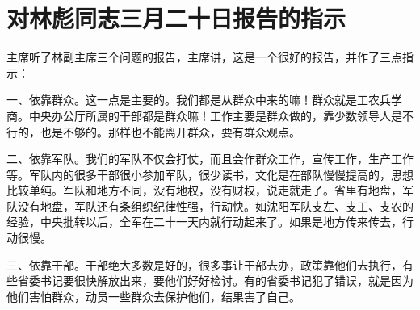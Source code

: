 \section[对林彪同志三月二十日报告的指示（一九六七年三月二十日）]{对林彪同志三月二十日报告的指示}


主席听了林副主席三个问题的报告，主席讲，这是一个很好的报告，并作了三点指示：

一、依靠群众。这一点是主要的。我们都是从群众中来的嘛！群众就是工农兵学商。中央办公厅所属的干部都是群众嘛！工作主要是群众做的，靠少数领导人是不行的，也是不够的。那样也不能离开群众，要有群众观点。

二、依靠军队。我们的军队不仅会打仗，而且会作群众工作，宣传工作，生产工作等。军队内的很多干部很小参加军队，很少读书，文化是在部队慢慢提高的，思想比较单纯。军队和地方不同，没有地权，没有财权，说走就走了。省里有地盘，军队没有地盘，军队还有条组织纪律性强，行动快。如沈阳军队支左、支工、支农的经验，中央批转以后，全军在二十一天内就行动起来了。如果是地方传来传去，行动很慢。

三、依靠干部。干部绝大多数是好的，很多事让干部去办，政策靠他们去执行，有些省委书记要很快解放出来，要他们好好检讨。有的省委书记犯了错误，就是因为他们害怕群众，动员一些群众去保护他们，结果害了自己。



